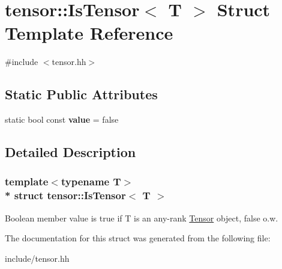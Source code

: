 \hypertarget{structtensor_1_1IsTensor}{}\section{tensor\+:\+:Is\+Tensor$<$ T $>$ Struct Template Reference}
\label{structtensor_1_1IsTensor}


{\ttfamily \#include $<$tensor.\+hh$>$}

\subsection*{Static Public Attributes}
\begin{DoxyCompactItemize}
\item 
static bool const {\bfseries value} = false\hypertarget{structtensor_1_1IsTensor_a88c6a8d3b9d648ad9d6fbef28ac6f078}{}\label{structtensor_1_1IsTensor_a88c6a8d3b9d648ad9d6fbef28ac6f078}

\end{DoxyCompactItemize}


\subsection{Detailed Description}
\subsubsection*{template$<$typename T$>$\\*
struct tensor\+::\+Is\+Tensor$<$ T $>$}

Boolean member {\ttfamily value} is true if T is an any-\/rank \hyperlink{classtensor_1_1Tensor}{Tensor} object, false o.\+w. 

The documentation for this struct was generated from the following file\+:\begin{DoxyCompactItemize}
\item 
include/tensor.\+hh\end{DoxyCompactItemize}
